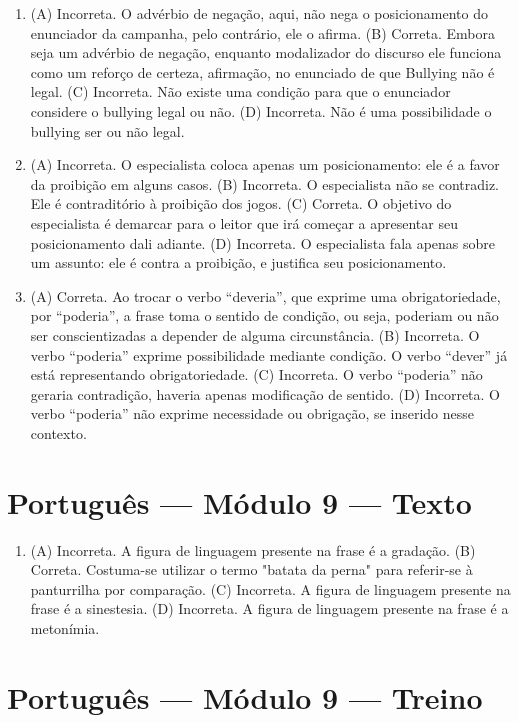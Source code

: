 \begin{enumerate}
\item (A) Incorreta. O advérbio de negação, aqui, não nega o posicionamento do
enunciador da campanha, pelo contrário, ele o afirma.
(B) Correta. Embora seja um advérbio de negação, enquanto modalizador do
discurso ele funciona como um reforço de certeza, afirmação, no
enunciado de que Bullying não é legal.
(C) Incorreta. Não existe uma condição para que o enunciador considere o
bullying legal ou não.
(D) Incorreta. Não é uma possibilidade o bullying ser ou não legal.

\item (A) Incorreta. O especialista coloca apenas um posicionamento: ele é a
favor da proibição em alguns casos.
(B) Incorreta. O especialista não se contradiz. Ele é contraditório à
proibição dos jogos.
(C) Correta. O objetivo do especialista é demarcar para o leitor que irá
começar a apresentar seu posicionamento dali adiante.
(D) Incorreta. O especialista fala apenas sobre um assunto: ele é contra
a proibição, e justifica seu posicionamento.

\item (A) Correta. Ao trocar o verbo ``deveria'', que exprime uma
obrigatoriedade, por ``poderia'', a frase toma o sentido de condição, ou
seja, poderiam ou não ser conscientizadas a depender de alguma
circunstância.
(B) Incorreta. O verbo ``poderia'' exprime possibilidade mediante
condição. O verbo ``dever'' já está representando obrigatoriedade.
(C) Incorreta. O verbo ``poderia'' não geraria contradição, haveria
apenas modificação de sentido.
(D) Incorreta. O verbo ``poderia'' não exprime necessidade ou obrigação,
se inserido nesse contexto.
\end{enumerate}

\section*{Português — Módulo 9 — Texto}

\begin{enumerate}
\item (A) Incorreta. A figura de linguagem presente na frase é a gradação.
(B) Correta. Costuma-se utilizar o termo "batata da perna" para
referir-se à panturrilha por comparação.
(C) Incorreta. A figura de linguagem presente na frase é a sinestesia.
(D) Incorreta. A figura de linguagem presente na frase é a metonímia.
\end{enumerate}

\section*{Português — Módulo 9 — Treino}

